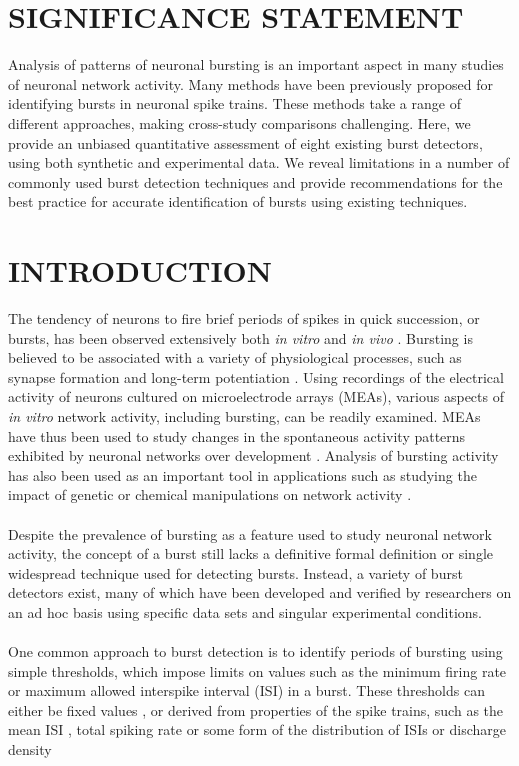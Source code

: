 \documentclass[12pt, titlepage]{article}
\begin{document}
	\section*{SIGNIFICANCE STATEMENT}
	Analysis of patterns of neuronal bursting is an important aspect in many studies of neuronal network activity. Many methods have been previously proposed for identifying bursts in neuronal spike trains. These methods take a range of different approaches, making cross-study comparisons challenging. Here, we provide an unbiased quantitative assessment of eight existing burst detectors, using both synthetic and experimental data. We reveal limitations in a number of commonly used burst detection techniques and provide recommendations for the best practice for accurate identification of bursts using existing techniques. 
	\section*{INTRODUCTION}
	The tendency of neurons to fire brief periods of spikes in quick succession, or bursts, has been observed extensively both \textit{in vitro} and \textit{in vivo} \cite{Weyand2001,Pasquale2010}. Bursting is believed to be associated with a variety of physiological processes, such as synapse formation \cite{Maeda1995} and long-term potentiation \cite{Lisman1997}. Using recordings of the electrical activity of neurons cultured on microelectrode arrays (MEAs), various aspects of \textit{in vitro} network activity, including bursting, can be readily examined. MEAs have thus been used to study changes in the spontaneous activity patterns exhibited by neuronal networks over development \cite{Wagenaar2006,Charlesworth2015}. Analysis of bursting activity has also been used as an important tool in applications such as studying the impact of genetic or chemical manipulations on network activity \cite{Eisenman2015,Charlesworth2016}. 
	\\ \\ Despite the prevalence of bursting as a feature used to study neuronal network activity, the concept of a burst still lacks a definitive formal definition \cite{Cocatre-Zilgien1992,Gourevitch2007} or single widespread technique used for detecting bursts. Instead, a variety of burst detectors exist, many of which have been developed and verified by researchers on an ad hoc basis using specific data sets and singular experimental conditions. 
	\\\\One common approach to burst detection is to identify periods of bursting using simple thresholds, which impose limits on values such as the minimum firing rate or maximum allowed interspike interval (ISI) in a burst. These thresholds can either be fixed values  \cite{Chiappalone2005,Mukai2003},  or derived from properties of the spike trains, such as the mean ISI \cite{Chen2009}, total spiking rate \cite{Pimashkin2011} or some form of the distribution of ISIs or discharge density 
\end{document}

